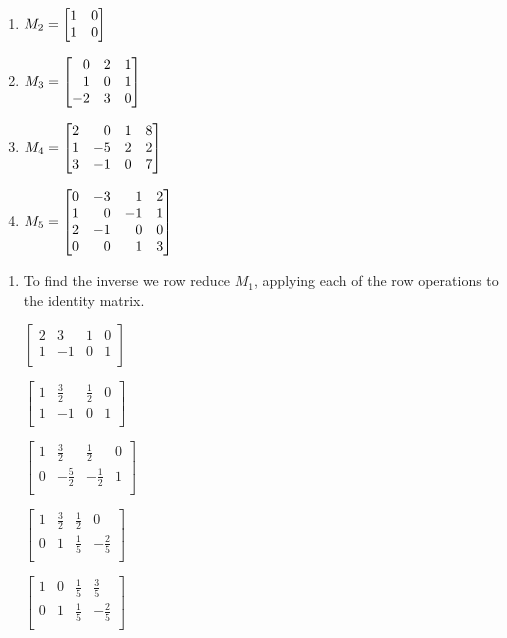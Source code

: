 \begin{exercises}
\begin{problist}
\begin{enumerate}
			\item $M_{2} = \mat{1&0\\1&0}$

			\item $M_{3} = \mat{0&2&1\\1&0&1\\-2&3&0}$

			\item $M_{4} = \mat{2&0&1&8\\1&-5&2&2\\3&-1&0&7}$

			\item $M_{5} = \mat{0&-3&1&2\\1&0&-1&1\\2&-1&0&0\\0&0&1&3}$
		\end{enumerate}

		\begin{solution}
	    \begin{enumerate}
				\item
				To find the inverse we row reduce $M_{1}$, applying each
				of the row operations to the identity matrix.

				$\left[\begin{array}{cc|cc}
							2&3&1&0\\
							1&-1&0&1\\
							\end{array}\right]$

				$\left[\begin{array}{cc|cc}
							1&\frac{3}{2}&\frac{1}{2}&0\\
							1&-1&0&1\\
							\end{array}\right]$

				$\left[\begin{array}{cc|cc}
							1&\frac{3}{2}&\frac{1}{2}&0\\
							0&-\frac{5}{2}&-\frac{1}{2}&1\\
							\end{array}\right]$

				$\left[\begin{array}{cc|cc}
							1&\frac{3}{2}&\frac{1}{2}&0\\
							0&1&\frac{1}{5}&-\frac{2}{5}\\
							\end{array}\right]$

				$\left[\begin{array}{cc|cc}
							1&0&\frac{1}{5}&\frac{3}{5}\\
							0&1&\frac{1}{5}&-\frac{2}{5}\\
							\end{array}\right]$


\end{enumerate}
\end{solution}
\end{problist}
\end{exercises}
